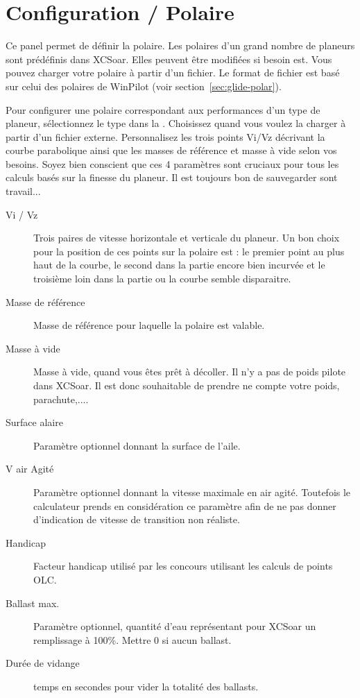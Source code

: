 \section{Configuration / Polaire}

Ce panel permet de définir la polaire. Les polaires d'un grand nombre de planeurs sont prédéfinis dans XCSoar. Elles peuvent être modifiées si besoin est. Vous pouvez charger votre polaire à partir d'un fichier. Le format de fichier est basé sur celui des polaires de WinPilot (voir section~\ref{sec:glide-polar}).

\label{conf:polar} Pour configurer une polaire correspondant aux performances d'un type de planeur, sélectionnez le type dans la . Choisissez  quand vous voulez la charger à partir d'un fichier externe. Personnalisez les trois points Vi/Vz décrivant la courbe parabolique ainsi que les masses de référence et masse à vide selon vos besoins.
\tip Soyez bien conscient que ces 4 paramètres sont cruciaux pour tous les calculs basés sur la finesse du planeur. 
 Il est toujours bon de sauvegarder sont travail...

\begin{description}
\item[Vi / Vz]  Trois paires de vitesse horizontale et verticale du planeur. Un bon choix pour la position de ces points sur la polaire est : le premier point au plus haut de la courbe, le second dans la partie encore bien incurvée et le troisième loin dans la partie ou la courbe semble disparaitre.
\item[Masse de référence]  Masse de référence pour laquelle la polaire est valable.
\item[Masse à vide]  Masse à vide, quand vous êtes prêt à décoller. Il n'y a pas de poids pilote dans XCSoar. Il est donc souhaitable de prendre ne compte votre poids, parachute,....
\item[Surface alaire]  Paramètre optionnel donnant la surface de l'aile.
\item[V air Agité] Paramètre optionnel donnant la vitesse maximale en air agité. Toutefois le calculateur prends en considération ce paramètre afin de ne pas donner d'indication de vitesse de transition non réaliste.
\item[Handicap]  Facteur handicap utilisé par les concours utilisant les calculs de points OLC.
\item[Ballast max.]  Paramètre optionnel, quantité d'eau représentant pour XCSoar un remplissage à 100\%. Mettre 0 si aucun ballast.
\item[Durée de vidange]  temps en secondes pour vider la totalité des ballasts.
\end{description}


